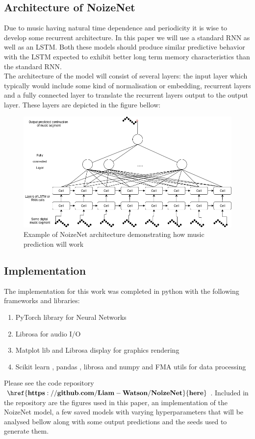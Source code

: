 \documentclass{article}
\begin{document}
\subsection{Architecture of NoizeNet}
\label{sec:arch}
Due to music having natural time dependence and periodicity it is wise to develop some recurrent architecture. In this paper we will use a standard RNN as well as an LSTM. Both these models should produce similar predictive behavior with the LSTM expected to exhibit better long term memory characteristics than the standard RNN. \\
The architecture of the model will consist of several layers: the input layer which typically would include some kind of normalisation or embedding,  recurrent layers and a fully connected layer to translate the recurrent layers output to the output layer. These layers are depicted in the figure bellow:
\begin{figure}[H]
\centering
\caption{Example of NoizeNet architecture demonstrating how music prediction will work}
\includegraphics[scale=0.5]{NoizeNetArch.png}
\end{figure}
\subsection{Implementation}
\label{sec:impl}
The implementation for this work was completed in python with the following frameworks and libraries:
\begin{enumerate}
\item PyTorch library for Neural Networks \cite{NEURIPS2019_9015}
\item Librosa for audio I/O \cite{mcfee2015librosa} 
\item Matplot lib \cite{Hunter:2007} and Librosa display \cite{mcfee2015librosa} for graphics rendering
\item Scikit learn \cite{scikit-learn}, pandas \cite{reback2020pandas} \cite{mckinney-proc-scipy-2010}, librosa \cite{mcfee2015librosa} and numpy \cite{harris2020array} and FMA utils \cite{fma_dataset}\cite{fma_challenge} for data processing 
\end{enumerate}
Please see the code repository $\mathbf{\href{https://github.com/Liam-Watson/NoizeNet}{here}}$. Included in the repository are the figures used in this paper, an implementation of the NoizeNet model, a few saved models with varying hyperparameters that will be analysed bellow along with some output predictions and the seeds used to generate them. 
\end{document}
